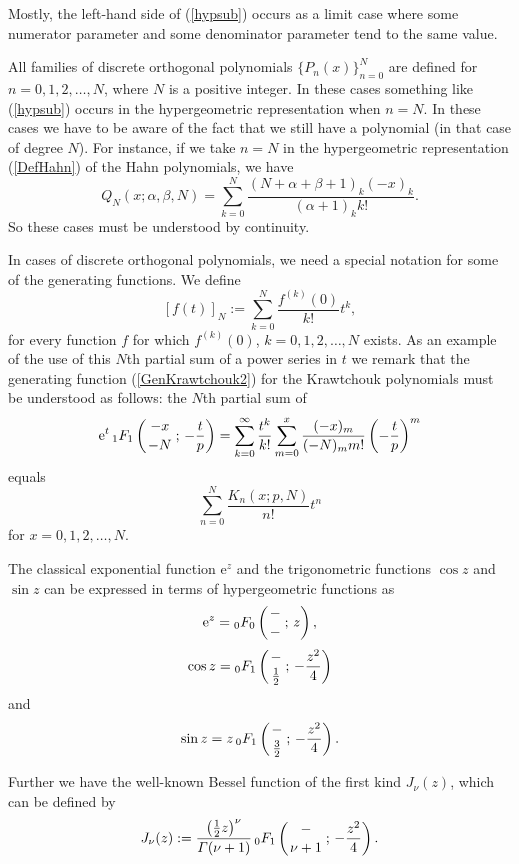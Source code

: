 \documentclass[envcountchap,graybox]{svmono}
\newcommand{\hyp}[5]{\mbox{}_{#1}{F}_{#2}
\left(\genfrac{}{}{0pt}{}{#3}{#4}\,;\,#5\right)}
\newcommand{\e}{\textrm{e}}
\renewcommand{\Gamma}{\varGamma}
\begin{document}
Mostly, the left-hand side of (\ref{hypsub}) occurs as a limit case where some numerator
parameter and some denominator parameter tend to the same value.

All families of discrete orthogonal polynomials $\{P_n(x)\}_{n=0}^N$ are
defined for $n=0,1,2,\ldots,N$, where $N$ is a positive integer. In these
cases something like (\ref{hypsub}) occurs in the hypergeometric representation when $n=N$.
In these cases we have to be aware of the fact that we still have a polynomial (in that case of
degree $N$). For instance, if we take $n=N$ in the hypergeometric representation (\ref{DefHahn})
of the Hahn polynomials, we have
$$Q_N(x;\alpha,\beta,N)=\sum_{k=0}^N\frac{(N+\alpha+\beta+1)_k(-x)_k}{(\alpha+1)_kk!}.$$
So these cases must be understood by continuity.

In cases of discrete orthogonal polynomials, we need a special notation for
some of the generating functions. We define
$$\left[f(t)\right]_N:=\sum_{k=0}^N\frac{f^{(k)}(0)}{k!}t^k,$$
for every function $f$ for which $f^{(k)}(0)$, $k=0,1,2,\ldots,N$ exists. As
an example of the use of this $N$th partial sum of a power series in $t$ we
remark that the generating function (\ref{GenKrawtchouk2}) for the
Krawtchouk polynomials must be understood as follows: the $N$th partial sum
of
$$\e^t\,\hyp{1}{1}{-x}{-N}{-\frac{t}{p}}=
\sum_{k=0}^{\infty}\frac{t^k}{k!}\sum_{m=0}^x\frac{(-x)_m}{(-N)_mm!}
\left(-\frac{t}{p}\right)^m$$
equals
$$\sum_{n=0}^N\frac{K_n(x;p,N)}{n!}t^n$$
for $x=0,1,2,\ldots,N$.

The classical exponential function $\e^z$ and the trigonometric functions
$\cos z$ and $\sin z$ can be expressed in terms of hypergeometric functions
as
\begin{equation}
\label{exp}
\e^z=\hyp{0}{0}{-}{-}{z},
\end{equation}
\begin{equation}
\label{cos}
\cos z=\hyp{0}{1}{-}{\frac{1}{2}}{-\frac{z^2}{4}}
\end{equation}
and
\begin{equation}
\label{sin}
\sin z=z\,\hyp{0}{1}{-}{\frac{3}{2}}{-\frac{z^2}{4}}.
\end{equation}

Further we have the well-known Bessel function of the first kind $J_{\nu}(z)$, which can be
defined by
\begin{equation}
\label{Bessel}\index{Bessel function}
J_{\nu}(z):=\frac{\left(\frac{1}{2}z\right)^{\nu}}{\Gamma(\nu+1)}\,
\hyp{0}{1}{-}{\nu+1}{-\frac{z^2}{4}}.
\end{equation}
\end{document}
